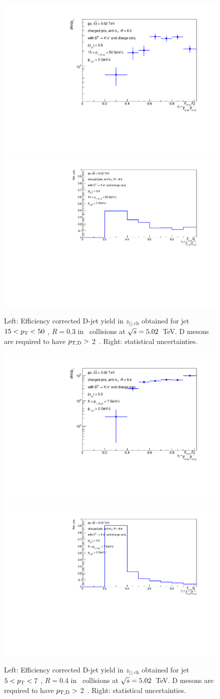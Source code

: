 \begin{figure}[bth]
\centering
\includegraphics[width=0.45\linewidth]{pp_2sig/R3_jetbin_15_50/jetPtSpectrum_SB_RebinProb_pTD5}
\includegraphics[width=0.45\linewidth]{pp_2sig/R3_jetbin_15_50/jetPtSpectrumUnc_SB_Rebin_pTD5}
\caption{Left: Efficiency corrected D-jet yield in $z_{||,\text{ch}}$ obtained for jet $15<p_{\text T}<50$ \GeVc, $R=0.3$ in \pp\ collisions at $\sqrt{s}=5.02$~TeV. D mesons are required to have $p_{\mathrm{T,D}}>$ 2~\GeVc. Right: statistical uncertainties.}
\label{fig:eq_pp_effCorr15_50_R3}
\end{figure}

\begin{figure}[bth]
\centering
\includegraphics[width=0.45\linewidth]{pp_2sig/R4_jetbin_5_7/jetPtSpectrum_SB_RebinProb_pTD2}
\includegraphics[width=0.45\linewidth]{pp_2sig/R4_jetbin_5_7/jetPtSpectrumUnc_SB_Rebin_pTD2}
\caption{Left: Efficiency corrected D-jet yield in $z_{||,\text{ch}}$ obtained for jet $5<p_{\text T}<7$ \GeVc, $R=0.4$ in \pp\ collisions at $\sqrt{s}=5.02$~TeV. D mesons are required to have $p_{\mathrm{T,D}}>$ 2~\GeVc. Right: statistical uncertainties.}
\label{fig:eq_pp_effCorr5_7_R4}
\end{figure}

